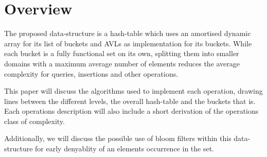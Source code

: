 \section{Overview}

    The proposed data-structure is a hash-table which uses an amortised dynamic
    array for its list of buckets and AVLs as implementation for its buckets.
    While each bucket is a fully functional set on its own, splitting them into
    smaller domains with a maximum average number of elements reduces the
    average complexity for queries, insertions and other operations.

    This paper will discuss the algorithms used to implement each operation,
    drawing lines between the different levels, the overall hash-table and the
    buckets that is. Each operations description will also include a short
    derivation of the operations class of complexity.

    Additionally, we will discuss the possible use of bloom filters within this
    data-structure for early denyablity of an elements occurrence in the set.



